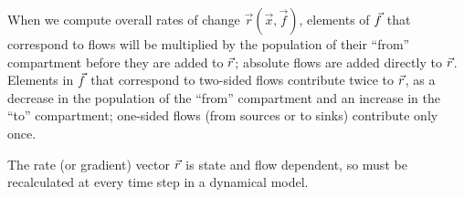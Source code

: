 
When we compute overall rates of change $\vec r(\vec x, \vec f)$, elements of $\vec{f}$ that correspond to \pc flows will be multiplied by the population of their ``from'' compartment before they are added to $\vec{r}$; absolute flows are added directly to $\vec{r}$. Elements in $\vec{f}$ that correspond to two-sided flows contribute twice to $\vec{r}$, as a decrease in the population of the ``from'' compartment and an increase in the ``to'' compartment; one-sided flows (from sources or to sinks) contribute only once.

The rate (or gradient) vector $\vec{r}$ is state and flow dependent, so must be recalculated at every time step in a dynamical model.

